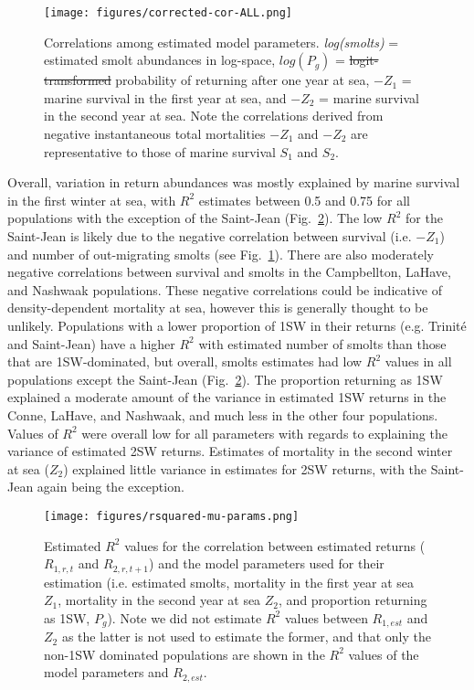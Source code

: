 \documentclass[12pt]{article}
\newcommand{\Pg}{$P_g$\xspace}
\providecommand{\DIFaddtex}[1]{{\protect\color{blue}\uwave{#1}}} %
\providecommand{\DIFdeltex}[1]{{\protect\color{red}\sout{#1}}}                      %
\providecommand{\DIFaddFL}[1]{\DIFadd{#1}} %
\providecommand{\DIFdelFL}[1]{\DIFdel{#1}} %
\providecommand{\DIFaddbeginFL}{} %
\providecommand{\DIFaddendFL}{} %
\providecommand{\DIFdelbeginFL}{} %
\providecommand{\DIFdelendFL}{} %
\providecommand{\DIFadd}[1]{\texorpdfstring{\DIFaddtex{#1}}{#1}} %
\providecommand{\DIFdel}[1]{\texorpdfstring{\DIFdeltex{#1}}{}} %
\begin{document}
\begin{figure}[htbp] \centering
    \texttt{[image: figures/corrected-cor-ALL.png]}
    \caption{Correlations among estimated model parameters. \emph{log(smolts)} = estimated smolt abundances in log-space, \DIFdelbeginFL \DIFdelFL{$log(P_g)$ }\DIFdelendFL \DIFaddbeginFL \DIFaddFL{$probit(P_g)$ }\DIFaddendFL = \DIFdelbeginFL \DIFdelFL{logit-transformed }\DIFdelendFL \DIFaddbeginFL \DIFaddFL{probit-transformed }\DIFaddendFL probability of
        returning after one year at sea, $-Z_1$ = marine survival in the first year at sea, and $-Z_2$ = marine survival in the second year at sea.
        Note the correlations derived from negative instantaneous total mortalities $-Z_1$ and $-Z_2$ are representative to those of marine survival $S_1$ and $S_2$.}
    \label{fig:cor-params}
\end{figure}
Overall, variation in return abundances was mostly explained by marine survival in the
first winter at sea, with $R^2$ estimates between 0.5 and 0.75 for all populations
with the exception of the Saint-Jean (Fig.~\ref{fig:mu-rsq}).
The low $R^2$ for the Saint-Jean is likely due to the negative correlation
between survival (i.e. $-Z_1$) and number of out-migrating smolts (see Fig.~\ref{fig:cor-params}).
There are also moderately negative correlations between survival and smolts in
the Campbellton, LaHave, and Nashwaak populations.
These negative correlations could be indicative of density-dependent
mortality at sea, however this is generally thought to be unlikely.
Populations with a lower proportion of 1SW in their returns (e.g. Trinit\'{e}
and Saint-Jean) have a higher $R^2$ with estimated number of smolts than those
that are 1SW-dominated, but overall, smolts estimates had low $R^2$ values in
all populations except the Saint-Jean (Fig.~\ref{fig:mu-rsq}).
The proportion returning as 1SW explained a moderate amount of the variance in
estimated 1SW returns in the Conne, LaHave, and Nashwaak, and much less in the
other four populations.
Values of $R^2$ were overall low for all parameters with regards to explaining
the variance of estimated 2SW returns. Estimates of mortality in the second winter at sea ($Z_2$)
explained little variance in estimates for 2SW returns, with the Saint-Jean again being the
exception.

\begin{figure}[htbp]
 \centering
    \texttt{[image: figures/rsquared-mu-params.png]}
    \caption{Estimated $R^2$ values for the correlation between estimated
        returns ($R_{1,r,t}$ and $R_{2,r,t+1}$) and the model parameters used
        for their estimation (i.e. estimated smolts, mortality in the first
        year at sea $Z_1$, mortality in the second year at sea $Z_2$, and
        proportion returning as 1SW, \Pg). Note we did not estimate $R^2$
        values between $R_{1,est}$ and $Z_2$ as the latter is not used to
        estimate the former, and that only the non-1SW dominated populations are
        shown in the $R^2$ values of the model parameters and $R_{2,est}$.}
    \label{fig:mu-rsq}

\end{figure}
\end{document}
